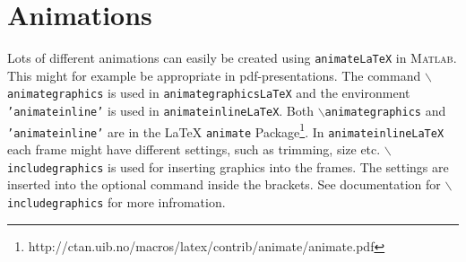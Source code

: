 \documentclass[12pt]{article}
\begin{document}
\newpage

\section{Animations}
Lots of different animations can easily be created using \texttt{animateLaTeX} in \textsc{Matlab}. This might for example be appropriate in pdf-presentations. The command \texttt{$\backslash$animategraphics} is used in \texttt{animategraphicsLaTeX} and the environment \texttt{'animateinline'} is used in \texttt{animateinlineLaTeX}. Both \texttt{$\backslash$animategraphics} and \texttt{'animateinline'} are in the \LaTeX{} \texttt{animate} Package\footnote{http://ctan.uib.no/macros/latex/contrib/animate/animate.pdf}. In \texttt{animateinlineLaTeX} each frame might have different settings, such as trimming, size etc. \texttt{$\backslash$includegraphics} is used for inserting graphics into the frames. The settings are inserted into the optional command inside the brackets. See documentation for \texttt{$\backslash$includegraphics} for more infromation.
\end{document}
